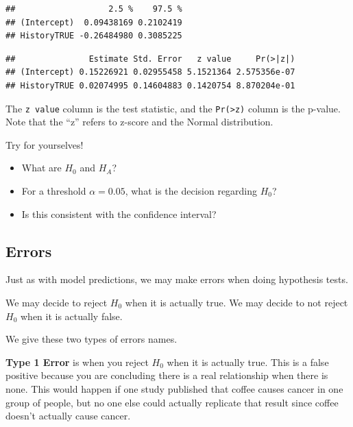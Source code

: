 \documentclass[]{book}
\newenvironment{Shaded}{\begin{snugshade}}{\end{snugshade}}
\newcommand{\KeywordTok}[1]{\textcolor[rgb]{0.13,0.29,0.53}{\textbf{#1}}}
\newcommand{\NormalTok}[1]{#1}
\newcommand{\OperatorTok}[1]{\textcolor[rgb]{0.81,0.36,0.00}{\textbf{#1}}}
\providecommand{\tightlist}{%
  \setlength{\itemsep}{0pt}\setlength{\parskip}{0pt}}
\begin{document}
\begin{verbatim}
##                   2.5 %    97.5 %
## (Intercept)  0.09438169 0.2102419
## HistoryTRUE -0.26484980 0.3085225
\end{verbatim}

\begin{Shaded}
\end{Shaded}

\begin{verbatim}
##               Estimate Std. Error   z value     Pr(>|z|)
## (Intercept) 0.15226921 0.02955458 5.1521364 2.575356e-07
## HistoryTRUE 0.02074995 0.14604883 0.1420754 8.870204e-01
\end{verbatim}

The \texttt{z\ value} column is the test statistic, and the \texttt{Pr(\textgreater{}\textbar{}z\textbar{})} column is the p-value. Note that the ``z'' refers to z-score and the Normal distribution.

Try for yourselves!

\begin{itemize}
\tightlist
\item
  What are \(H_0\) and \(H_A\)?
\item
  For a threshold \(\alpha = 0.05\), what is the decision regarding \(H_0\)?
\item
  Is this consistent with the confidence interval?
\end{itemize}

\hypertarget{errors}{%
\subsection{Errors}\label{errors}}

Just as with model predictions, we may make errors when doing hypothesis tests.

We may decide to reject \(H_0\) when it is actually true. We may decide to not reject \(H_0\) when it is actually false.

We give these two types of errors names.

\textbf{Type 1 Error} is when you reject \(H_0\) when it is actually true. This is a false positive because you are concluding there is a real relationship when there is none. This would happen if one study published that coffee causes cancer in one group of people, but no one else could actually replicate that result since coffee doesn't actually cause cancer.
\end{document}
